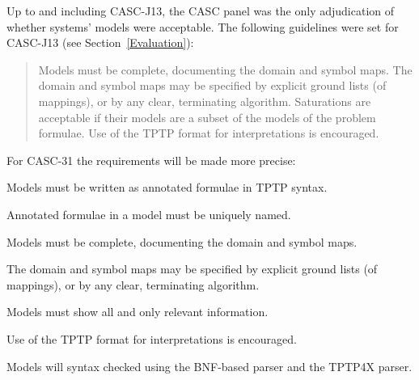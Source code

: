 \documentclass[aic]{iosart2x}
\newenvironment{packed_enumerate}{
\vspace*{-0.3em}
\begin{enumerate}
  \setlength{\partopsep}{0pt}
  \setlength{\itemsep}{1pt}
  \setlength{\parskip}{0pt}
  \setlength{\parsep}{0pt}
}{\end{enumerate}}
\newcommand{\THIS}{\mbox{CASC-J13}}
\newcommand{\NEXT}{\mbox{CASC-31}}
\begin{document}
Up to and including \THIS{}, the CASC panel was the only adjudication of whether systems' 
models were acceptable. 
The following guidelines were set for \THIS{} (see Section~\ref{Evaluation}):
\begin{quote}
Models must be complete, documenting the domain and symbol maps. 
The domain and symbol maps may be specified by explicit ground lists (of mappings), or by 
any clear, terminating algorithm. 
Saturations are acceptable if their models are a subset of the models of the problem formulae. 
Use of the TPTP format for interpretations is encouraged.
\end{quote}
For \NEXT{} the requirements will be made more precise:
\begin{packed_enumerate}
\item[1.] Models must be written as annotated formulae in TPTP syntax.
\item[2.] Annotated formulae in a model must be uniquely named.
\item[3.] Models must be complete, documenting the domain and symbol maps.
\item[4.] The domain and symbol maps may be specified by explicit ground lists (of mappings), 
          or by any clear, terminating algorithm.
\item[5.] Models must show all and only relevant information.
\item[6.] Use of the TPTP format for interpretations is encouraged.
\end{packed_enumerate}
Models will syntax checked using the BNF-based parser and the TPTP4X parser.
\end{document}

